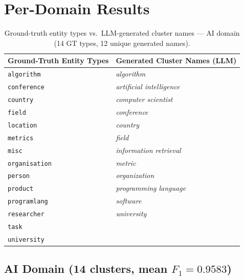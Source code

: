 \documentclass[11pt,a4paper]{article}
\begin{document}
\section{Per-Domain Results}

\begin{table}[ht]
\centering
\footnotesize
\caption{Ground-truth entity types vs.\ LLM-generated cluster names --- AI domain
(14 GT types, 12 unique generated names).}
\label{tab:gt_map_ai}
\setlength{\tabcolsep}{8pt}
\begin{tabular}{l l}
\toprule
\textbf{Ground-Truth Entity Types} & \textbf{Generated Cluster Names (LLM)} \\
\midrule
  \texttt{algorithm} & \textit{algorithm} \\
  \texttt{conference} & \textit{artificial intelligence} \\
  \texttt{country} & \textit{computer scientist} \\
  \texttt{field} & \textit{conference} \\
  \texttt{location} & \textit{country} \\
  \texttt{metrics} & \textit{field} \\
  \texttt{misc} & \textit{information retrieval} \\
  \texttt{organisation} & \textit{metric} \\
  \texttt{person} & \textit{organization} \\
  \texttt{product} & \textit{programming language} \\
  \texttt{programlang} & \textit{software} \\
  \texttt{researcher} & \textit{university} \\
  \texttt{task} &  \\
  \texttt{university} &  \\
\bottomrule
\end{tabular}
\end{table}

\FloatBarrier

\subsection{AI Domain (14 clusters, mean $F_1 = 0.9583$)}
\end{document}
